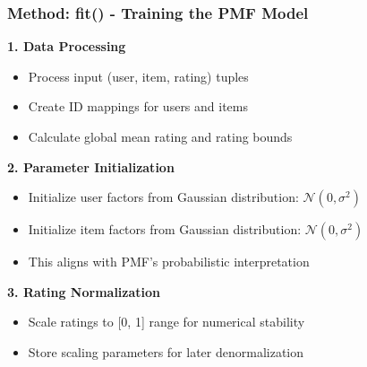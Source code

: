 \documentclass{beamer}
\begin{document}
\begin{frame}
\frametitle{Method: fit() - Training the PMF Model}

    \textbf{1. Data Processing}
    \begin{itemize}
        \item Process input (user, item, rating) tuples
        \item Create ID mappings for users and items
        \item Calculate global mean rating and rating bounds
    \end{itemize}

    \vspace{0.5cm}
    
    \textbf{2. Parameter Initialization}
    \begin{itemize}
        \item Initialize user factors from Gaussian distribution: $\mathcal{N}(0, \sigma^2)$
        \item Initialize item factors from Gaussian distribution: $\mathcal{N}(0, \sigma^2)$
        \item This aligns with PMF's probabilistic interpretation
    \end{itemize}

    \vspace{0.5cm}
    
    \textbf{3. Rating Normalization}
    \begin{itemize}
        \item Scale ratings to [0, 1] range for numerical stability
        \item Store scaling parameters for later denormalization
    \end{itemize}
\end{frame}
\end{document}
